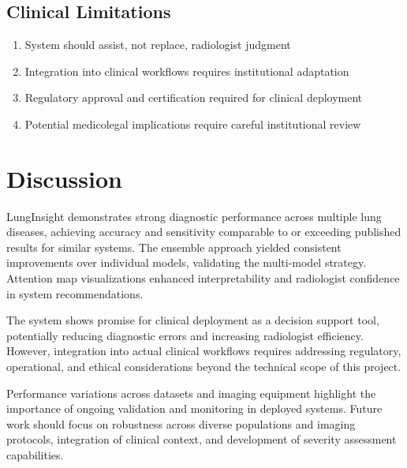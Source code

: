 {\subsection{Clinical Limitations}

\begin{enumerate}
    \item System should assist, not replace, radiologist judgment
    \item Integration into clinical workflows requires institutional adaptation
    \item Regulatory approval and certification required for clinical deployment
    \item Potential medicolegal implications require careful institutional review
\end{enumerate}

\section{Discussion}

LungInsight demonstrates strong diagnostic performance across multiple lung diseases, achieving accuracy and sensitivity comparable to or exceeding published results for similar systems. The ensemble approach yielded consistent improvements over individual models, validating the multi-model strategy. Attention map visualizations enhanced interpretability and radiologist confidence in system recommendations.

The system shows promise for clinical deployment as a decision support tool, potentially reducing diagnostic errors and increasing radiologist efficiency. However, integration into actual clinical workflows requires addressing regulatory, operational, and ethical considerations beyond the technical scope of this project.

Performance variations across datasets and imaging equipment highlight the importance of ongoing validation and monitoring in deployed systems. Future work should focus on robustness across diverse populations and imaging protocols, integration of clinical context, and development of severity assessment capabilities.

}
